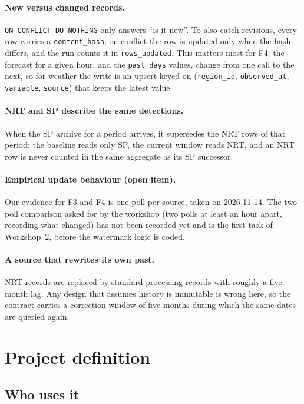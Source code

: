 \documentclass[11pt,a4paper]{article}
\newcommand{\code}[1]{\texttt{\small #1}}
\begin{document}
\paragraph{New versus changed records.} \code{ON CONFLICT DO NOTHING} only answers ``is it new''.
To also catch revisions, every row carries a \code{content\_hash}; on conflict the row is updated
only when the hash differs, and the run counts it in \code{rows\_updated}. This matters most for F4:
the forecast for a given hour, and the \code{past\_days} values, change from one call to the next, so
for weather the write is an upsert keyed on (\code{region\_id}, \code{observed\_at},
\code{variable}, \code{source}) that keeps the latest value.

\paragraph{NRT and SP describe the same detections.} When the SP archive for a period arrives, it
supersedes the NRT rows of that period: the baseline reads only SP, the current window reads NRT, and
an NRT row is never counted in the same aggregate as its SP successor.

\paragraph{Empirical update behaviour (open item).} Our evidence for F3 and F4 is one poll per
source, taken on 2026-11-14. The two-poll comparison asked for by the workshop (two polls at least an
hour apart, recording what changed) has not been recorded yet and is the first task of Workshop~2,
before the watermark logic is coded.

\paragraph{A source that rewrites its own past.} NRT records are replaced by standard-processing
records with roughly a five-month lag. Any design that assumes history is immutable is wrong here,
so the contract carries a correction window of five months during which the same dates are queried
again.

\section{Project definition}

\subsection{Who uses it}
\end{document}

